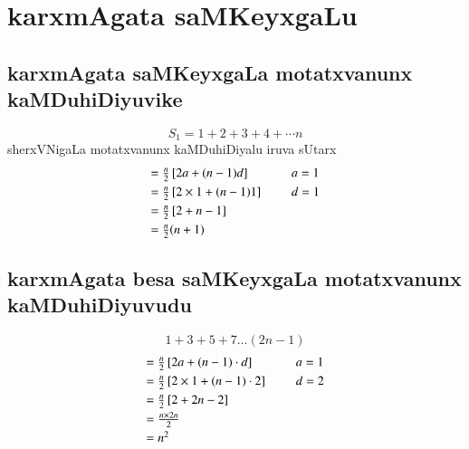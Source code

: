 \chapter{karxmAgata saMKeyxgaLu}

\section*{\;karxmAgata saMKeyxgaLa motatxvanunx kaMDuhiDiyuvike}
$$
S_{1} = 1+2+3+4+\cdots n 
$$
sherxVNigaLa motatxvanunx kaMDuhiDiyalu iruva sUtarx
$$
\begin{array}[t]{l}
=\frac{n}{2}\left[2a+(n-1)d\right]\\[0.1cm]
=\frac{n}{2}\left[2\times 1 +(n-1)1\right]\\[0.1cm]
=\frac{n}{2}\left[2+n-1\right] \\[0.1cm]
=\frac{n}{2}(n+1)
\end{array}
\hspace{0.5cm}
\begin{array}[t]{l}
a = 1\\[0.1cm]
d=1
\end{array}
$$

\section*{\;karxmAgata besa saMKeyxgaLa motatxvanunx kaMDuhiDiyuvudu}
$$
1+3+5+7\ldots(2n-1)
$$
$$
\begin{array}[t]{l}
=\frac{n}{2}\left[2a+(n-1)\cdot d\right] \\[0.1cm]
=\frac{n}{2}\left[2\times 1 +(n-1)\cdot 2\right]\\[0.1cm]
=\frac{n}{2}\left[2+2n-2\right]\\[0.1cm]
=\frac{{n \times 2n}}{2}\\[0.1cm]
=n^{2}
\end{array}
\hspace{0.5cm}
\begin{array}[t]{l}
a = 1\\[0.1cm]
d=2
\end{array}
$$

